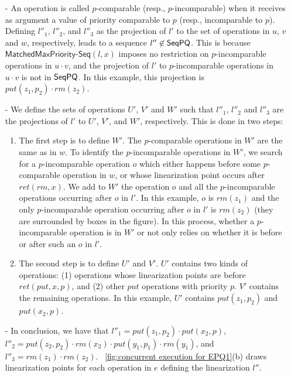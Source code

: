 \begin{itemize}
\item[-] An operation is called $p$-comparable (resp., $p$-incomparable) when it receives as argument a value of priority comparable to $p$ (resp., incomparable to $p$). Defining $l''_1$, $l''_2$, and $l''_3$ as the projection of $l'$ to the set of operations in $u$, $v$ and $w$, respectively, leads to a sequence $l''\not\in\mathsf{SeqPQ}$. This is because $\mathsf{MatchedMaxPriority\text{-}Seq}(l,x)$ imposes no restriction on  $p$-incomparable operations in $u \cdot v$, and the projection of $l'$ to $p$-incomparable operations in $u \cdot v$ is not in $\mathsf{SeqPQ}$. In this example, this projection is $\textit{put}(z_1,p_2) \cdot \textit{rm}(z_2)$.

\item[-] We define the sets of operations $U'$, $V'$ and $W'$ such that $l''_1$, $l''_2$ and $l''_3$ are the projections of $l'$ to $U'$, $V'$, and $W'$, respectively. This is done in two steps:
\begin{enumerate}
\item The first step is to define $W'$. The $p$-comparable operations in $W'$ are the same as in $w$. To identify the $p$-incomparable operations in $W'$, we search for a $p$-incomparable operation $o$ which either happens before some $p$-comparable operation in $w$, or whose linearization point occurs after $\textit{ret}(\textit{rm},x)$. We add to $W'$ the operation $o$ and all the $p$-incomparable operations occurring after $o$ in $l'$. In this example, $o$ is $\textit{rm}(z_1)$ and the only $p$-incomparable operation occurring after $o$ in $l'$ is $\textit{rm}(z_2)$ (they are surrounded by boxes in the figure). In this process, whether a $p$-incomparable operation is in $W'$ or not only relies on whether it is before or after such an $o$ in $l'$.
\item The second step is to define $U'$ and $V'$. $U'$ contains two kinds of operations: (1) operations whose linearization points are before $\textit{ret}(\textit{put},x,p)$, and (2) other $\textit{put}$ operations with priority $p$. $V'$ contains the remaining operations. In this example, $U'$ contains $\textit{put}(z_1,p_2)$ and $\textit{put}(x_2,p)$.
\end{enumerate}
\item[-] In conclusion, we have that $l''_1 = \textit{put}(z_1,p_2) \cdot \textit{put}(x_2,p)$, $l''_2 = \textit{put}(z_2,p_2) \cdot \textit{rm}(x_2) \cdot \textit{put}(y_1,p_1) \cdot \textit{rm}(y_1)$, and $l''_3 = \textit{rm}(z_1) \cdot \textit{rm}(z_2)$. \figurename~\ref{fig:concurrent execution for EPQ1}(b) draws linearization points for each operation in $e$ defining the linearization $l''$.
\end{itemize}




